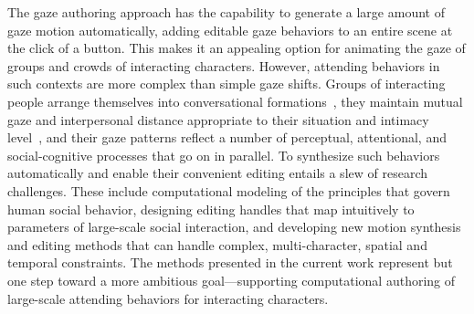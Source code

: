 The gaze authoring approach has the capability to generate a large amount of gaze motion automatically, adding editable gaze behaviors to an entire scene at the click of a button. This makes it an appealing option for animating the gaze of groups and crowds of interacting characters. However, attending behaviors in such contexts are more complex than simple gaze shifts. Groups of interacting people arrange themselves into conversational formations~\citep{kendon2010spacing}, they maintain mutual gaze and interpersonal distance appropriate to their situation and intimacy level~\citep{argyle1965eyecontact}, and their gaze patterns reflect a number of perceptual, attentional, and social-cognitive processes that go on in parallel. To synthesize such behaviors automatically and enable their convenient editing entails a slew of research challenges. These include computational modeling of the principles that govern human social behavior, designing editing handles that map intuitively to parameters of large-scale social interaction, and developing new motion synthesis and editing methods that can handle complex, multi-character, spatial and temporal constraints. The methods presented in the current work represent but one step toward a more ambitious goal---supporting computational authoring of large-scale attending behaviors for interacting characters. 